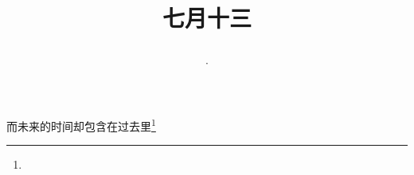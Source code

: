 \title{\date[d=16,m=8,y=2024][year:cn-y,年,month:cn,day:cn,日,·,weekday]·七月十三 }
而未来的时间却包含在过去里\footnote{ }

